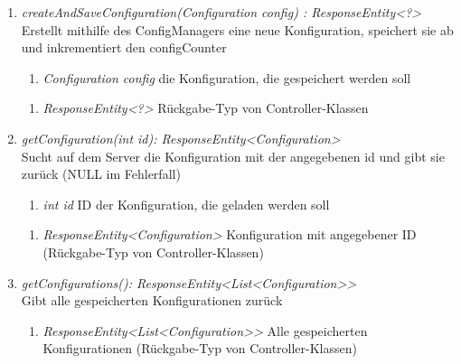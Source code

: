 \begin{enumerate}[+]
	\item \textit{ createAndSaveConfiguration(Configuration config) : ResponseEntity<?> } \\
	Erstellt mithilfe des ConfigManagers eine neue Konfiguration, speichert sie ab und inkrementiert den configCounter
	
	\begin{enumerate}[$\bullet$]
		\item \textit{Configuration config} die Konfiguration, die gespeichert werden soll
	\end{enumerate}
	\vspace{-0.2cm}
	\begin{enumerate}[$\circ$]
		\item \textit{ResponseEntity<?>} Rückgabe-Typ von Controller-Klassen
	\end{enumerate}
	
		\item \textit{ getConfiguration(int id): ResponseEntity<Configuration> }\\
		Sucht auf dem Server die Konfiguration mit der angegebenen id und gibt sie zurück (NULL im Fehlerfall)
	
	\begin{enumerate}[$\bullet$]
		\item \textit{int id} ID der Konfiguration, die geladen werden soll
		
	\end{enumerate}
	\vspace{-0.2cm}
	\begin{enumerate}[$\circ$]
		\item \textit{ResponseEntity<Configuration>} Konfiguration mit angegebener ID (Rückgabe-Typ von Controller-Klassen)
	\end{enumerate}
	\item \textit{ getConfigurations(): ResponseEntity<List<Configuration>> }\\
	Gibt alle gespeicherten Konfigurationen zurück
	
	\begin{enumerate}[$\circ$]
		\item \textit{ResponseEntity<List<Configuration>>} Alle gespeicherten Konfigurationen (Rückgabe-Typ von Controller-Klassen)
	\end{enumerate}
\end{enumerate}